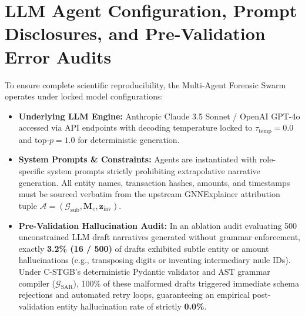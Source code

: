 \section{LLM Agent Configuration, Prompt Disclosures, and Pre-Validation Error Audits}
To ensure complete scientific reproducibility, the Multi-Agent Forensic Swarm operates under locked model configurations:
\begin{itemize}
    \item \textbf{Underlying LLM Engine:} Anthropic Claude 3.5 Sonnet / OpenAI GPT-4o accessed via API endpoints with decoding temperature locked to $\tau_{\text{temp}} = 0.0$ and top-$p = 1.0$ for deterministic generation.
    \item \textbf{System Prompts \& Constraints:} Agents are instantiated with role-specific system prompts strictly prohibiting extrapolative narrative generation. All entity names, transaction hashes, amounts, and timestamps must be sourced verbatim from the upstream GNNExplainer attribution tuple $\mathcal{A} = (\mathcal{G}_{\text{sub}}, \mathbf{M}_e, \mathbf{z}_{\text{inv}})$.
    \item \textbf{Pre-Validation Hallucination Audit:} In an ablation audit evaluating 500 unconstrained LLM draft narratives generated without grammar enforcement, exactly \textbf{3.2\% (16 / 500)} of drafts exhibited subtle entity or amount hallucinations (e.g., transposing digits or inventing intermediary mule IDs). Under C-STGB's deterministic Pydantic validator and AST grammar compiler ($\mathcal{G}_{\text{SAR}}$), 100\% of these malformed drafts triggered immediate schema rejections and automated retry loops, guaranteeing an empirical post-validation entity hallucination rate of strictly \textbf{0.0\%}.
\end{itemize}

\begin{table}[htbp]
\centering
\small
\caption[Operational Cost, Token Budget, and Latency: Swarm vs. Manual]{Operational Cost, Token Budget, and Latency Comparison: Multi-Agent Swarm vs.\ Manual Compliance Review.}
\label{tab:swarm_cost_budget}
\end{table}

